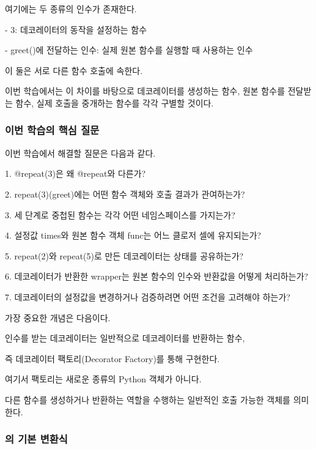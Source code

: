 여기에는 두 종류의 인수가 존재한다.

\begin{dhksmry}
    - 3: 데코레이터의 동작을 설정하는 함수

    - greet()에 전달하는 인수: 실제 원본 함수를 실행할 때 사용하는 인수
\end{dhksmry}

이 둘은 서로 다른 함수 호출에 속한다.

이번 학습에서는 이 차이를 바탕으로 데코레이터를 생성하는 함수, 원본 함수를 전달받는 함수, 실제 호출을 중개하는 함수를 각각 구별할 것이다.

\subsubsection{이번 학습의 핵심 질문}

이번 학습에서 해결할 질문은 다음과 같다.

\begin{dhksmry}
1. @repeat(3)은 왜 @repeat와 다른가?

2. repeat(3)(greet)에는 어떤 함수 객체와 호출 결과가 관여하는가?

3. 세 단계로 중첩된 함수는 각각 어떤 네임스페이스를 가지는가?

4. 설정값 times와 원본 함수 객체 func는 어느 클로저 셀에 유지되는가?

5. repeat(2)와 repeat(5)로 만든 데코레이터는 상태를 공유하는가?

6. 데코레이터가 반환한 wrapper는 원본 함수의 인수와 반환값을 어떻게 
   처리하는가?

7. 데코레이터의 설정값을 변경하거나 검증하려면 어떤 조건을 고려해야 하는가?
\end{dhksmry}

가장 중요한 개념은 다음이다.

\begin{dhksmry}[centered]
인수를 받는 데코레이터는 일반적으로 데코레이터를 반환하는 함수,

즉 데코레이터 팩토리(Decorator Factory)를 통해 구현한다.
\end{dhksmry}

여기서 팩토리는 새로운 종류의 Python 객체가 아니다.

다른 함수를 생성하거나 반환하는 역할을 수행하는 일반적인 호출 가능한 객체를 의미한다.

\subsubsection{의 기본 변환식}

